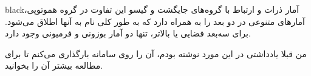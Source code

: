 \documentclass{article}
\begin{document}
\begin{boxes}{black}{آمار ذرات و ارتباط با گروه‌های جایگشت و گیسو}
این تفاوت در گروه هموتوپی‌، آمارهای متنوعی در دو بعد را به همراه دارد که به طور کلی نام 
به آنها اطلاق می‌شود. برای سه‌بعد فضایی یا بالاتر، تنها دو آمار بوزونی و فرمیونی وجود دارد.

من قبلا یادداشتی در این مورد نوشته بودم، آن را روی سامانه بارگذاری می‌کنم تا برای مطالعه بیشتر آن را بخوانید.

\end{boxes}

 
\end{document}
